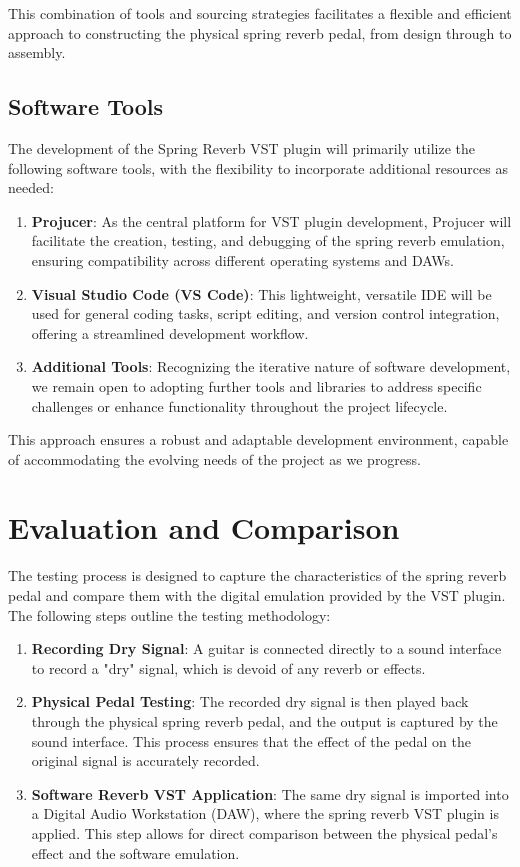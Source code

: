 \documentclass[12pt]{article}
\begin{document}
This combination of tools and sourcing strategies facilitates a flexible and efficient approach to constructing the physical spring reverb pedal, from design through to assembly.

\subsection{Software Tools}
The development of the Spring Reverb VST plugin will primarily utilize the following software tools, with the flexibility to incorporate additional resources as needed:

\begin{enumerate}
    \item \textbf{Projucer}: As the central platform for VST plugin development, Projucer will facilitate the creation, testing, and debugging of the spring reverb emulation, ensuring compatibility across different operating systems and DAWs.
    \item \textbf{Visual Studio Code (VS Code)}: This lightweight, versatile IDE will be used for general coding tasks, script editing, and version control integration, offering a streamlined development workflow.
    \item \textbf{Additional Tools}: Recognizing the iterative nature of software development, we remain open to adopting further tools and libraries to address specific challenges or enhance functionality throughout the project lifecycle.
\end{enumerate}

This approach ensures a robust and adaptable development environment, capable of accommodating the evolving needs of the project as we progress.


\newpage
\section{Evaluation and Comparison}
The testing process is designed to capture the characteristics of the spring reverb pedal and compare them with the digital emulation provided by the VST plugin. The following steps outline the testing methodology:
\begin{enumerate}
    \item \textbf{Recording Dry Signal}: A guitar is connected directly to a sound interface to record a "dry" signal, which is devoid of any reverb or effects.
    \item \textbf{Physical Pedal Testing}: The recorded dry signal is then played back through the physical spring reverb pedal, and the output is captured by the sound interface. This process ensures that the effect of the pedal on the original signal is accurately recorded.
    \item \textbf{Software Reverb VST Application}: The same dry signal is imported into a Digital Audio Workstation (DAW), where the spring reverb VST plugin is applied. This step allows for direct comparison between the physical pedal's effect and the software emulation.
\end{enumerate}
\end{document}
